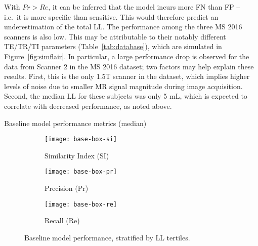 \par
With $Pr > Re$, it can be inferred that %
the model incurs more FN than FP -- i.e.\ it is more specific than sensitive.
This would therefore predict an underestimation of the total LL.
The performance among the three MS 2016 scanners is also low.
This may be attributable to their notably different TE/TR/TI parameters
(Table~\ref{tab:database}), which are simulated in Figure~\ref{fig:simflair}.
In particular, a large performance drop is observed for
the data from Scanner 2 in the MS 2016 dataset;
two factors may help explain these results.
First, this is the only 1.5T scanner in the dataset,
which implies higher levels of noise due to
smaller MR signal magnitude during image acquisition.
Second, the median LL for these subjects was only 5 mL,
which is expected to correlate with decreased performance, as noted above.
\par
\begin{table}
  \centering
  \caption{Baseline model performance metrics (median)}%
  \label{tab:seg-base}
  
\end{table}
\begin{figure}
  \centering
  \begin{subfigure}{0.32\textwidth}
    \centering
    \texttt{[image: base-box-si]}
    \caption{Similarity Index (SI)}%
    \label{fig:seg-base-si}
  \end{subfigure}
  \begin{subfigure}{0.32\textwidth}
    \centering
    \texttt{[image: base-box-pr]}
    \caption{Precision (Pr)}%
    \label{fig:seg-base-pr}
  \end{subfigure}
  \begin{subfigure}{0.32\textwidth}
    \centering
    \texttt{[image: base-box-re]}
    \caption{Recall (Re)}%
    \label{fig:seg-base-re}
  \end{subfigure}
  \caption{Baseline model performance, stratified by LL tertiles.}%
  \label{fig:seg-base}
\end{figure}
